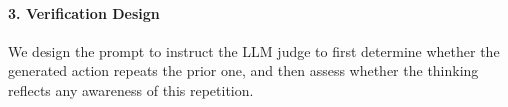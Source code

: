 \paragraph{3. Verification Design}


We design the prompt to instruct the LLM judge to first determine whether the generated action repeats the prior one, and then assess whether the thinking reflects any awareness of this repetition.

